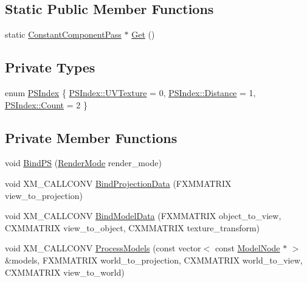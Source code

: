 \subsection*{Static Public Member Functions}
\begin{DoxyCompactItemize}
\item 
static \hyperlink{classmage_1_1_constant_component_pass}{Constant\+Component\+Pass} $\ast$ \hyperlink{classmage_1_1_constant_component_pass_ae8c8c69c9e69c4324e390833c2e3653b}{Get} ()
\end{DoxyCompactItemize}
\subsection*{Private Types}
\begin{DoxyCompactItemize}
\item 
enum \hyperlink{classmage_1_1_constant_component_pass_a5700234587f2aa0ebdb4f7790704f00b}{P\+S\+Index} \{ \hyperlink{classmage_1_1_constant_component_pass_a5700234587f2aa0ebdb4f7790704f00ba73dca3b76eca77b89c050588adba1c2b}{P\+S\+Index\+::\+U\+V\+Texture} = 0, 
\hyperlink{classmage_1_1_constant_component_pass_a5700234587f2aa0ebdb4f7790704f00ba0aa6f4210bf373c95eda00232e93cd98}{P\+S\+Index\+::\+Distance} = 1, 
\hyperlink{classmage_1_1_constant_component_pass_a5700234587f2aa0ebdb4f7790704f00bae93f994f01c537c4e2f7d8528c3eb5e9}{P\+S\+Index\+::\+Count} = 2
 \}
\end{DoxyCompactItemize}
\subsection*{Private Member Functions}
\begin{DoxyCompactItemize}
\item 
void \hyperlink{classmage_1_1_constant_component_pass_a6027d0f628ffd03618aebacb35672c6e}{Bind\+PS} (\hyperlink{namespacemage_a5e7e18b0154373ce8fc942fe3f6b27fd}{Render\+Mode} render\+\_\+mode)
\item 
void X\+M\+\_\+\+C\+A\+L\+L\+C\+O\+NV \hyperlink{classmage_1_1_constant_component_pass_ac542f1d2645b0636f14454d008c1e84e}{Bind\+Projection\+Data} (F\+X\+M\+M\+A\+T\+R\+IX view\+\_\+to\+\_\+projection)
\item 
void X\+M\+\_\+\+C\+A\+L\+L\+C\+O\+NV \hyperlink{classmage_1_1_constant_component_pass_a196372d184f74c8f268adc1e7865ef17}{Bind\+Model\+Data} (F\+X\+M\+M\+A\+T\+R\+IX object\+\_\+to\+\_\+view, C\+X\+M\+M\+A\+T\+R\+IX view\+\_\+to\+\_\+object, C\+X\+M\+M\+A\+T\+R\+IX texture\+\_\+transform)
\item 
void X\+M\+\_\+\+C\+A\+L\+L\+C\+O\+NV \hyperlink{classmage_1_1_constant_component_pass_a4d3b510a03f9612c73be230662470bf0}{Process\+Models} (const vector$<$ const \hyperlink{classmage_1_1_model_node}{Model\+Node} $\ast$ $>$ \&models, F\+X\+M\+M\+A\+T\+R\+IX world\+\_\+to\+\_\+projection, C\+X\+M\+M\+A\+T\+R\+IX world\+\_\+to\+\_\+view, C\+X\+M\+M\+A\+T\+R\+IX view\+\_\+to\+\_\+world)
\end{DoxyCompactItemize}
